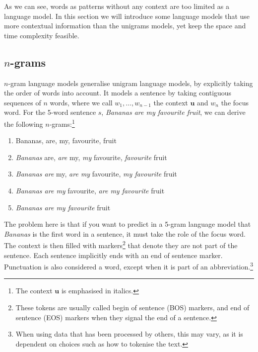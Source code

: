 
As we can see, words as patterns without any context are too limited as a language model.
In this section we will introduce some language models that use more contextual information than the unigrams models, yet keep the space and time complexity feasible.

\subsection{$n$-grams}
$n$-gram language models generalise unigram language models, by explicitly taking the order of words into account. It models a sentence by taking contiguous sequences of $n$ words, where we call $w_1,\ldots,w_{n-1}$ the context $\mathbf{u}$ and $w_n$ the focus word. For the 5-word sentence $s$, \emph{Bananas are my favourite fruit}, we can derive the following $n$-grams:\footnote{The context $\mathbf{u}$ is emphasised in italics.}

\begin{enumerate}
	\item Bananas, are, my, favourite, fruit
	\item \emph{Bananas} are, \emph{are} my, \emph{my} favourite, \emph{favourite} fruit
	\item \emph{Bananas are} my, \emph{are my} favourite, \emph{my favourite} fruit
	\item \emph{Bananas are my} favourite, \emph{are my favourite} fruit
	\item \emph{Bananas are my favourite} fruit
\end{enumerate}



The problem here is that if you want to predict in a 5-gram language model that \emph{Bananas} is the first word in a sentence, it must take the role of the focus word. The context is then filled with markers\footnote{These tokens are usually called begin of sentence (BOS) markers, and end of sentence (EOS) markers when they signal the end of a sentence.} that denote they are not part of the sentence. Each sentence implicitly ends with an end of sentence marker. %
Punctuation is also considered a word, except when it is part of an abbreviation.\footnote{When using data that has been processed by others, this may vary, as it is dependent on choices such as how to tokenise the text.}

